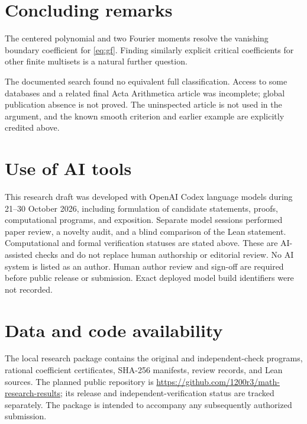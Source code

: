 \documentclass[11pt,reqno]{amsart}
\theoremstyle{remark}
\begin{document}
\section{Concluding remarks}

The centered polynomial and two Fourier moments resolve the vanishing
boundary coefficient for \eqref{eq:gf}. Finding similarly explicit critical
coefficients for other finite multisets is a natural further question.

The documented search found no equivalent full classification. Access to
some databases and a related final Acta Arithmetica article was incomplete;
global publication absence is not proved. The uninspected article is not
used in the argument, and the known smooth criterion and earlier example
are explicitly credited above.

\section*{Use of AI tools}
This research draft was developed with OpenAI Codex language models during
21--30 October 2026, including
formulation of candidate statements, proofs, computational programs, and
exposition. Separate model sessions performed paper review, a novelty audit,
and a blind comparison of the Lean statement. Computational and formal
verification statuses are stated above. These are AI-assisted checks and
do not replace human authorship or editorial review. No AI system is listed
as an author. Human author review and sign-off are required before public
release or submission.
Exact deployed model build identifiers were not recorded.

\section*{Data and code availability}
The local research package contains the original and independent-check
programs, rational coefficient certificates, SHA-256 manifests, review
records, and Lean sources. The planned public repository is \url{https://github.com/1200r3/math-research-results}; its release and independent-verification status are tracked separately. The package is intended to accompany any subsequently authorized
submission.



\end{document}
